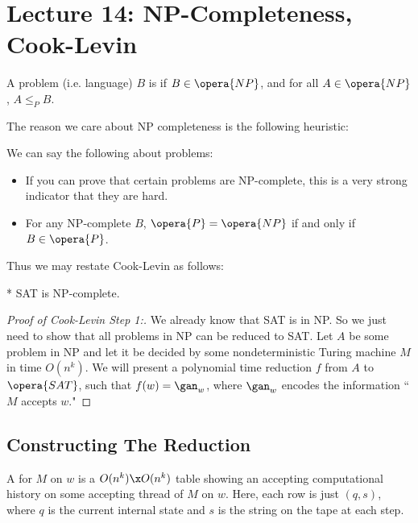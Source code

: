 \section*{Lecture 14: NP-Completeness, Cook-Levin}
\setcounter{section}{14}

\begin{defn}
	A problem (i.e. language) $B$ is  if $B\in \opera{NP}$, and for all $A\in \opera{NP}$, $A\leq_P B$.
\end{defn}

The reason we care about NP completeness is the following heuristic:

\begin{fact}
	We can say the following about problems:
	\begin{itemize}
		\item If you can prove that certain problems are NP-complete, this is a very strong indicator that they are hard. 
		\item For any NP-complete $B$, $\opera{P} = \opera{NP}$ if and only if $B\in \opera{P}$.
	\end{itemize}
\end{fact}

Thus we may restate Cook-Levin as follows:

\begin{thm}*
	SAT is NP-complete.
\end{thm}

\begin{proof}
	[Proof of Cook-Levin Step 1:]
	We already know that SAT is in NP. So we just need to show that all problems in NP can be reduced to SAT.
	Let $A$ be some problem in NP and let it be decided by some nondeterministic Turing machine $M$ in time $O(n^k)$.
	We will present a polynomial time reduction $f$ from $A$ to $\opera{SAT}$, such that $f(w) = \gan_w$, where $\gan_w$ encodes the information ``$M$ accepts $w$."
\end{proof}

\subsection{Constructing The Reduction}

\begin{defn}
	A  for $M$ on $w$ is a $O(n^k) \x O(n^k)$ table showing an accepting computational history on some accepting thread of $M$ on $w$.
	Here, each row is just $(q,s)$, where $q$ is the current internal state and $s$ is the string on the tape at each step.
\end{defn}


